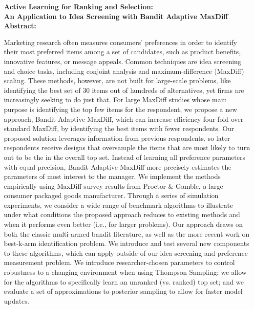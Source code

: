 \documentclass[a4paper,12pt]{article}
\newcommand{\titleofthispaper}{
	\textbf{Active Learning for Ranking and Selection: \\
	An Application to Idea Screening with Bandit Adaptive MaxDiff} 
}
\begin{document}




\titleofthispaper \\





\textbf{Abstract:}
{%
Marketing research often measures consumers' preferences in order to identify their most preferred items among a set of candidates, such as product benefits, innovative features, or message appeals. Common techniques are idea screening and choice tasks, including conjoint analysis and maximum-difference (MaxDiff) scaling. These methods, however, are not built for large-scale problems, like identifying the best set of 30 items out of hundreds of alternatives, yet firms are increasingly seeking to do just that. For large MaxDiff studies whose main purpose is identifying the top few items for the respondent, we propose a new approach, Bandit Adaptive MaxDiff, which can increase efficiency four-fold over standard MaxDiff, by identifying the best items with fewer respondents. Our proposed solution leverages information from previous respondents, so later respondents receive designs that oversample the items that are most likely to turn out to be the in the overall top set. Instead of learning all preference parameters with equal precision, Bandit Adaptive MaxDiff more precisely estimates the parameters of most interest to the manager. We implement the methods empirically using MaxDiff survey results from Proctor \& Gamble, a large consumer packaged goods manufacturer.  Through a series of simulation experiments, we consider a wide range of benchmark algorithms to illustrate under what conditions the proposed approach reduces to existing methods and when it performs even better (i.e., for larger problems).  Our approach draws on both the classic multi-armed bandit literature, as well as the more recent work on best-k-arm identification problem. We introduce and test several new components to these algorithms, which can apply outside of our idea screening and preference measurement problem. We introduce researcher-chosen parameters to control robustness to a changing environment when using Thompson Sampling; we allow for the algorithms to specifically learn an unranked (vs. ranked) top set; and we evaluate a set of approximations to posterior sampling to allow for faster model updates.

}~ \\
\end{document}
